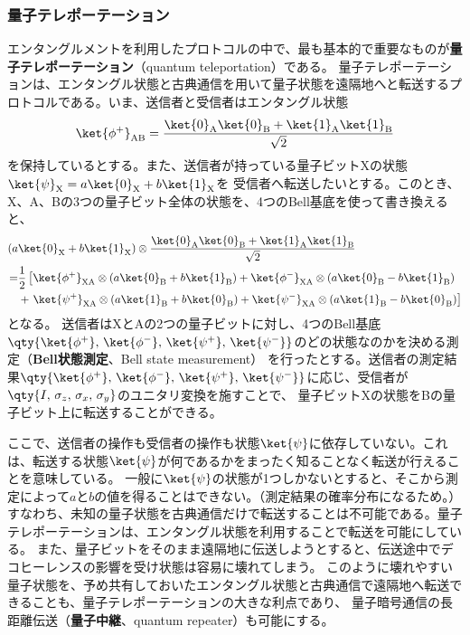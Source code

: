 \documentclass[a4paper,11pt,uplatex]{jsarticle}%
\begin{document}
\newpage

\subsubsection{量子テレポーテーション}
エンタングルメントを利用したプロトコルの中で、最も基本的で重要なものが\textbf{量子テレポーテーション}（quantum teleportation）である。
量子テレポーテーションは、エンタングル状態と古典通信を用いて量子状態を遠隔地へと転送するプロトコルである。いま、送信者と受信者はエンタングル状態
\begin{equation}
  \ket{\phi^{+}}_{\text{AB}} = \frac{\ket{0}_{\text{A}}\ket{0}_{\text{B}} + \ket{1}_{\text{A}}\ket{1}_{\text{B}}}{\sqrt{2}}
\end{equation}
を保持しているとする。また、送信者が持っている量子ビットXの状態$\ket{\psi}_{\text{X}} = a\ket{0}_{\text{X}} + b\ket{1}_{\text{X}}$を
受信者へ転送したいとする。このとき、X、A、Bの3つの量子ビット全体の状態を、4つのBell基底を使って書き換えると、
\begin{align}
  (a&\ket{0}_{\text{X}}+b\ket{1}_{\text{X}})\otimes  \frac{\ket{0}_{\text{A}}\ket{0}_{\text{B}} + \ket{1}_{\text{A}}\ket{1}_{\text{B}}}{\sqrt{2}} \notag\\
  =& \frac{1}{2}\left[\ket{\phi^{+}}_{\text{XA}}\otimes(a\ket{0}_{\text{B}}+b\ket{1}_{\text{B}}) + \ket{\phi^{-}}_{\text{XA}}\otimes(a\ket{0}_{\text{B}}-b\ket{1}_{\text{B}})\right.\notag\\
  &+\left.\ket{\psi^{+}}_{\text{XA}}\otimes(a\ket{1}_{\text{B}}+b\ket{0}_{\text{B}}) + \ket{\psi^{-}}_{\text{XA}}\otimes(a\ket{1}_{\text{B}}-b\ket{0}_{\text{B}})\right]
\end{align}
となる。
送信者はXとAの2つの量子ビットに対し、4つのBell基底$\qty{\ket{\phi^+},\,\ket{\phi^{-}},\,\ket{\psi^{+}},\,\ket{\psi^{-}}}$のどの状態なのかを決める測定（\textbf{Bell状態測定}、Bell state measurement）
を行ったとする。送信者の測定結果$\qty{\ket{\phi^+},\,\ket{\phi^{-}},\,\ket{\psi^{+}},\,\ket{\psi^{-}}}$に応じ、受信者が$\qty{I,\,\sigma_z,\,\sigma_x,\,\sigma_y}$のユニタリ変換を施すことで、
量子ビットXの状態をBの量子ビット上に転送することができる。

ここで、送信者の操作も受信者の操作も状態$\ket{\psi}$に依存していない。これは、転送する状態$\ket{\psi}$が何であるかをまったく知ることなく転送が行えることを意味している。
一般に$\ket{\psi}$の状態が1つしかないとすると、そこから測定によって$a$と$b$の値を得ることはできない。（測定結果の確率分布になるため。）
すなわち、未知の量子状態を古典通信だけで転送することは不可能である。量子テレポーテーションは、エンタングル状態を利用することで転送を可能にしている。
また、量子ビットをそのまま遠隔地に伝送しようとすると、伝送途中でデコヒーレンスの影響を受け状態は容易に壊れてしまう。
このように壊れやすい量子状態を、予め共有しておいたエンタングル状態と古典通信で遠隔地へ転送できることも、量子テレポーテーションの大きな利点であり、
量子暗号通信の長距離伝送（\textbf{量子中継}、quantum repeater）も可能にする。
\end{document}

